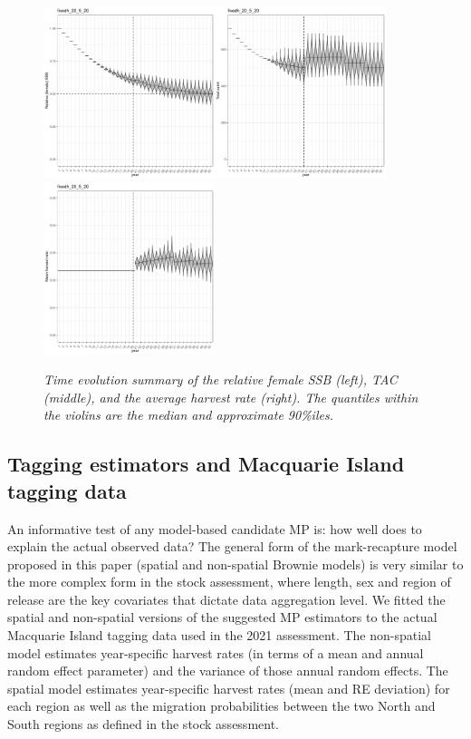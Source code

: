 \documentclass[12pt,a4paper,twoside,times,sky,standard]{csiroreport2017}
\begin{document}
\begin{figure}[hb]
    \begin{center}
        \includegraphics[width=5cm,height=5cm]{figs/fixedh_dep.pdf}\includegraphics[width=5cm,height=5cm]{figs/fixedh_tac.pdf}\includegraphics[width=5cm,height=5cm]{figs/fixedh_hrate.pdf}
    \end{center}
    \caption{\textit{Time evolution summary of the relative female SSB (left), TAC (middle), and the average harvest rate (right). The quantiles within the violins are the median and approximate 90\%iles.}}
\end{figure}

\subsection{Tagging estimators and Macquarie Island tagging data}

An informative test of any model-based candidate MP is: how well does to explain the actual observed data? The general form of the mark-recapture model proposed in this paper (spatial and non-spatial Brownie models) is very similar to the more complex form in the stock assessment, where length, sex and region of release are the key covariates that dictate data aggregation level. We fitted the spatial and non-spatial versions of the suggested MP estimators to the actual Macquarie Island tagging data used in the 2021 assessment. The non-spatial model estimates year-specific harvest rates (in terms of a mean and annual random effect parameter) and the variance of those annual random effects. The spatial model estimates year-specific harvest rates (mean and RE deviation) for each region as well as the migration probabilities between the two North and South regions as defined in the stock assessment. 
\end{document}
